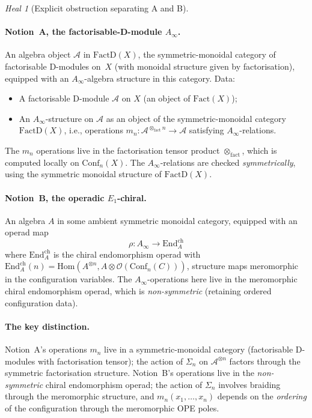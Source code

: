 \documentclass[11pt]{article}
\theoremstyle{definition}
\theoremstyle{remark}
\newtheorem{heal}[thm]{Heal}
\newcommand{\cA}{\mathcal{A}}
\newcommand{\cO}{\mathcal{O}}
\newcommand{\Conf}{\mathrm{Conf}}
\newcommand{\End}{\mathrm{End}}
\newcommand{\Hom}{\mathrm{Hom}}
\newcommand{\Eone}{E_1}
\newcommand{\ch}{\mathrm{ch}}
\begin{document}
\begin{heal}[Explicit obstruction separating A and B]
\label{heal:five-notions}
\paragraph{Notion~A, the factorisable-D-module $A_\infty$.}
An algebra object $\cA$ in $\mathrm{FactD}(X)$, the
symmetric-monoidal category of factorisable D-modules on~$X$
(with monoidal structure given by factorisation), equipped with an
$A_\infty$-algebra structure in this category. Data:
\begin{itemize}[leftmargin=*,itemsep=0pt]
\item A factorisable D-module $\cA$ on $X$ (an object of
$\mathrm{Fact}(X)$);
\item An $A_\infty$-structure on $\cA$ as an object of the
symmetric-monoidal category $\mathrm{FactD}(X)$, i.e., operations
$m_n\colon \cA^{\otimes_{\mathrm{fact}} n} \to \cA$ satisfying
$A_\infty$-relations.
\end{itemize}
The $m_n$ operations live in the factorisation tensor product
$\otimes_{\mathrm{fact}}$, which is computed locally on
$\Conf_n(X)$. The $A_\infty$-relations are checked
\emph{symmetrically}, using the symmetric monoidal structure of
$\mathrm{FactD}(X)$.

\paragraph{Notion~B, the operadic $\Eone$-chiral.}
An algebra $A$ in some ambient symmetric monoidal category, equipped
with an operad map
\[
\rho\colon A_\infty \to \End^{\ch}_A
\]
where $\End^{\ch}_A$ is the chiral endomorphism operad with
$\End^{\ch}_A(n) = \Hom(A^{\otimes n}, A \otimes \cO(\Conf_n(C)))$,
structure maps meromorphic in the configuration variables. The
$A_\infty$-operations here live in the meromorphic chiral
endomorphism operad, which is \emph{non-symmetric} (retaining
ordered configuration data).

\paragraph{The key distinction.}
Notion~A's operations $m_n$ live in a symmetric-monoidal category
(factorisable D-modules with factorisation tensor); the action of
$\Sigma_n$ on $\cA^{\otimes n}$ factors through the symmetric
factorisation structure. Notion~B's operations live in the
\emph{non-symmetric} chiral endomorphism operad; the action of
$\Sigma_n$ involves braiding through the meromorphic structure, and
$m_n(x_1, \ldots, x_n)$ depends on the \emph{ordering} of the
configuration through the meromorphic OPE poles.


\end{heal}
\end{document}
